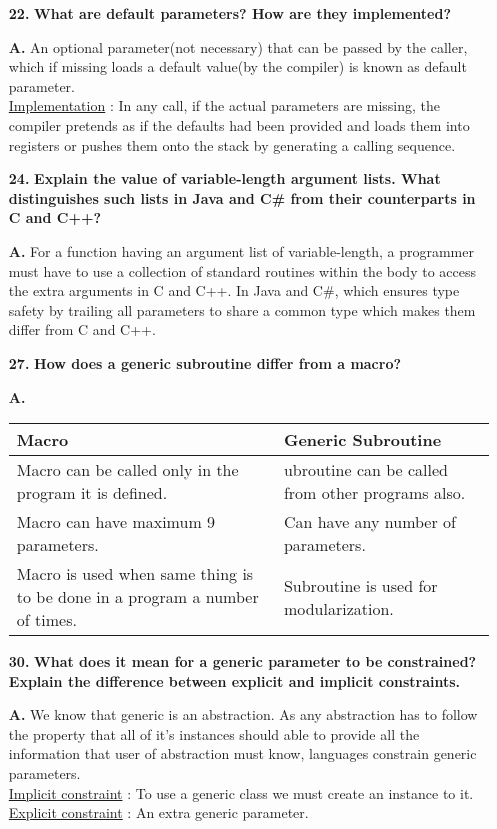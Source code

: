 \documentclass[letterpaper]{article}
\begin{document}
\begin{large}
\begin{flushleft}
\begin{enumerate}
\item[\textbf{22.}]
\textbf{What are default parameters? How are they implemented?}
\item[\textbf{A.}]
An optional parameter(not necessary) that can be passed by the caller, which if missing loads a default value(by the compiler) is known as default parameter.\\
\underline{Implementation} : In any call, if the actual parameters are missing, the compiler pretends as if the defaults had been provided and loads them into registers or pushes them onto the stack by generating a calling sequence.

\item[\textbf{24.}]
\textbf{Explain the value of variable-length argument lists. What distinguishes such lists in Java and C\# from their counterparts in C and C++?}
\item[\textbf{A.}]
For a function having an argument list of variable-length, a programmer must have to use a collection of standard routines within the body to access the extra arguments in C and C++. In Java and C\#, which ensures type safety by trailing all parameters to share a common type which makes them differ from C and C++.

\item[\textbf{27.}]
\textbf{How does a generic subroutine differ from a macro?}
\item[\textbf{A.}]
\begin{tabular}{| m{8.55cm} | m{8.55cm} |}
\hline
\textbf{Macro} & \textbf{Generic Subroutine}\\
\hline
Macro can be called only in the program it is defined. & ubroutine can be called from other programs also.\\
\hline
Macro can have maximum 9 parameters. & Can have any number of parameters.\\
\hline
Macro is used when same thing is to be done in a program a number of times. & Subroutine is used for modularization.\\
\hline
\end{tabular}

\item[\textbf{30.}]
\textbf{What does it mean for a generic parameter to be constrained? Explain the difference between explicit and implicit constraints.}
\item[\textbf{A.}]
We know that generic is an abstraction. As any abstraction has to follow the property that all of it's instances should able to provide all the information that user of abstraction must know, languages constrain generic parameters.\\
\underline{Implicit constraint} : To use a generic class we must create an instance to it.\\
\underline{Explicit constraint} : An extra generic parameter. 


\end{enumerate}
\end{flushleft}
\end{large}
\end{document}
